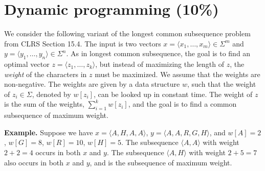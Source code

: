 \section{Dynamic programming (10\%)}

We consider the following variant of the longest common subsequence problem from CLRS Section 15.4.
The input is two vectors $x=\langle x_1,\dots,x_m\rangle \in \Sigma^m$ and $y=\langle y_1,\dots,y_n\rangle \in \Sigma^n$.
As in longest common subsequence, the goal is to find an optimal vector $z=\langle z_1,\dots,z_k\rangle$, but instead of maximizing the length of $z$, the \emph{weight} of the characters in $z$ must be maximized.
We assume that the weights are non-negative.
The weights are given by a data structure $w$, such that the weight of $z_i \in\Sigma$, denoted by $w[z_i]$, can be looked up in constant time.
The weight of $z$ is the sum of the weights, $\sum_{i=1}^k w[z_i]$, and the goal is to find a common subsequence of maximum weight.

\medskip

{\bf Example.} Suppose we have $x=\langle A, H, A, A \rangle$, $y=\langle A, A, R, G, H \rangle$, and $w[A] = 2$, $w[G]=8$, $w[R] = 10$, $w[H] = 5$. The subsequence $\langle A, A \rangle$ with weight $2+2 = 4$ occurs in both $x$ and $y$. The subsequence $\langle A, H \rangle$ with weight $2+5 = 7$ also occurs in both $x$ and $y$, and is the subsequence of maximum weight.





